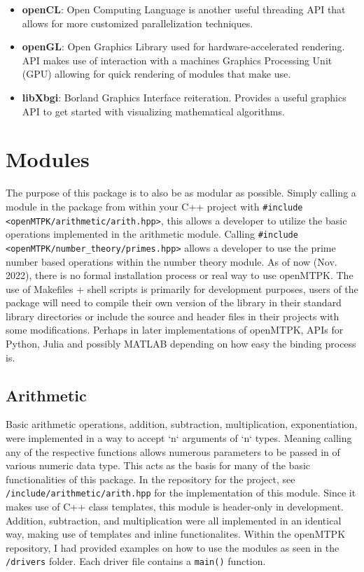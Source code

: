 \documentclass[12pt, letterpaper]{article}
\begin{document}
\begin{sloppypar}
\begin{flushleft}
\begin{itemize}
\item \textbf{openCL}: Open Computing Language is another useful threading API that allows for
more customized parallelization techniques. 

\item \textbf{openGL}: Open Graphics Library used for hardware-accelerated rendering. API
makes use of interaction with a machines Graphics Processing Unit (GPU) allowing for quick
rendering of modules that make use.

\item \textbf{libXbgi}: Borland Graphics Interface reiteration. Provides a useful graphics API
to get started with visualizing mathematical algorithms.

\end{itemize}


\section{Modules}
The purpose of this package is to also be as modular as possible. Simply calling a module in 
the package from within your C++ project with \verb|#include <openMTPK/arithmetic/arith.hpp>|, 
this allows a developer to utilize the basic operations implemented in the arithmetic module.
Calling \verb|#include <openMTPK/number_theory/primes.hpp>| allows a developer to use the 
prime number based operations within the number theory module. \linebreak
As of now (Nov. 2022), there is no formal installation process or real way to use openMTPK.
The use of Makefiles + shell scripts is primarily for development purposes, users of the 
package will need to compile their own version of the library in their standard
library directories or include the source and header files in their projects with some 
modifications. \linebreak
Perhaps in later implementations of openMTPK, APIs for Python, Julia and possibly MATLAB 
depending on how easy the binding process is. 

\subsection{Arithmetic}
Basic arithmetic operations, addition, subtraction, multiplication, exponentiation, were 
implemented in a way to accept `n` arguments of `n` types. Meaning calling any of the 
respective functions allows numerous parameters to be passed in of various numeric data type. 
This acts as the basis for many of the basic functionalities of this package.
In the repository for the project, see \verb|/include/arithmetic/arith.hpp| for the 
implementation of this module. Since it makes use of C++ class templates, this module is 
header-only in development. Addition, subtraction, and multiplication were all implemented 
in an identical way, making use of templates and inline functionalites. Within the openMTPK 
repository, I had provided examples on how to use the modules as seen in the 
\verb|/drivers| folder. Each driver file contains a \verb|main()| function.


\end{flushleft}
\end{sloppypar}
\end{document}
